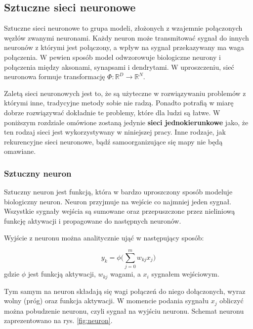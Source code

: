 \subsection{Sztuczne sieci neuronowe}
\label{sec:ann}
Sztuczne sieci neuronowe to grupa modeli, złożonych z wzajemnie połączonych węzłów zwanymi neuronami. Każdy neuron może transmitować sygnał do innych neuronów z którymi jest połączony, a wpływ na sygnał przekazywany ma waga połączenia. W pewien sposób model odwzorowuje biologiczne neurony i połączenia między aksonami, synapsami i dendrytami. W uproszczeniu, sieć neuronowa formuje transformację $\Phi:\mathbb{R}^D\rightarrow \mathbb{R}^N$\cite{matematyk2022-fh}. 
\par
Zaletą sieci neuronowych jest to, że są użyteczne w rozwiązywaniu problemów z którymi inne, tradycyjne metody sobie nie radzą. Ponadto potrafią w miarę dobrze rozwiązywać dokładnie te problemy, które dla ludzi są łatwe\cite{Karnga1999}. W poniższym rozdziale omówione zostaną jedynie \textbf{sieci jednokierunkowe}  jako, że ten rodzaj sieci jest wykorzystywany w niniejszej pracy. Inne rodzaje, jak rekurencyjne sieci neuronowe, bądź samoorganizujące się mapy nie będą omawiane. 

\subsubsection{Sztuczny neuron}
\label{sec:ArtificialNeuron}
Sztuczny neuron jest funkcją, która w bardzo uproszczony sposób modeluje biologiczny neuron. Neuron przyjmuje na wejście co najmniej jeden sygnał. Wszystkie sygnały wejścia są sumowane oraz przepuszczone przez nieliniową funkcję aktywacji i propagowane do następnych neuronów\cite{krenker2011introduction}. 
\par
Wyjście z neuronu można analitycznie ująć w następujący sposób:
\par
\[y_k=\phi\bigg(\sum_{j=0}^m w_{kj}x_j\bigg)\]
gdzie $\phi$ jest funkcją aktywacji, $w_{kj}$ wagami, a $x_i$ sygnałem wejściowym.
 \par Tym samym na neuron składają się wagi połączeń do niego dołączonych, wyraz wolny (próg) oraz funkcja aktywacji. W momencie podania sygnału $x_j$ obliczyć można pobudzenie neuronu, czyli sygnał na wyjściu neuronu. Schemat neuronu zaprezentowano na rys. \ref{fig:neuron}.
 

